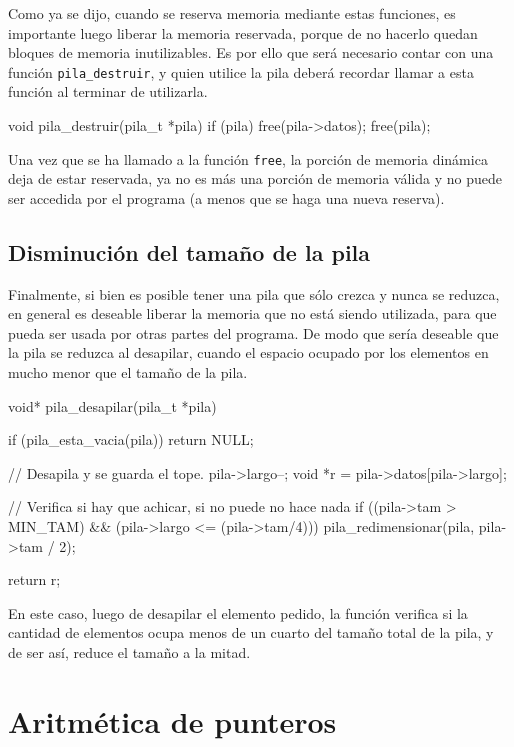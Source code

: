 Como ya se dijo, cuando se reserva memoria mediante estas funciones, es
importante luego liberar la memoria reservada, porque de no hacerlo quedan
bloques de memoria inutilizables.  Es por ello que será necesario contar con
una función \lstinline!pila_destruir!, y quien utilice la pila deberá recordar
llamar a esta función al terminar de utilizarla.

\begin{codigo-c-plano}
void pila_destruir(pila_t *pila)
{
    if (pila) free(pila->datos);
    free(pila);
}
\end{codigo-c-plano}

Una vez que se ha llamado a la función \lstinline!free!, la porción de memoria
dinámica deja de estar reservada, ya no es más una porción de memoria válida y
no puede ser accedida por el programa (a menos que se haga una nueva reserva).

\subsection{Disminución del tamaño de la pila}

Finalmente, si bien es posible tener una pila que sólo crezca y nunca se
reduzca, en general es deseable liberar la memoria que no está siendo
utilizada, para que pueda ser usada por otras partes del programa.  De modo
que sería deseable que la pila se reduzca al desapilar, cuando el espacio
ocupado por los elementos en mucho menor que el tamaño de la pila.

\begin{codigo-c-plano}
void* pila_desapilar(pila_t *pila)
{
    if (pila_esta_vacia(pila)) return NULL;

    // Desapila y se guarda el tope.
    pila->largo--;
    void *r = pila->datos[pila->largo];

    // Verifica si hay que achicar, si no puede no hace nada
    if ((pila->tam > MIN_TAM) && (pila->largo <= (pila->tam/4))) {
        pila_redimensionar(pila, pila->tam / 2);
    }

    return r;
}
\end{codigo-c-plano}

En este caso, luego de desapilar el elemento pedido, la función verifica si la
cantidad de elementos ocupa menos de un cuarto del tamaño total de la pila, y
de ser así, reduce el tamaño a la mitad.

\section{Aritmética de punteros}

